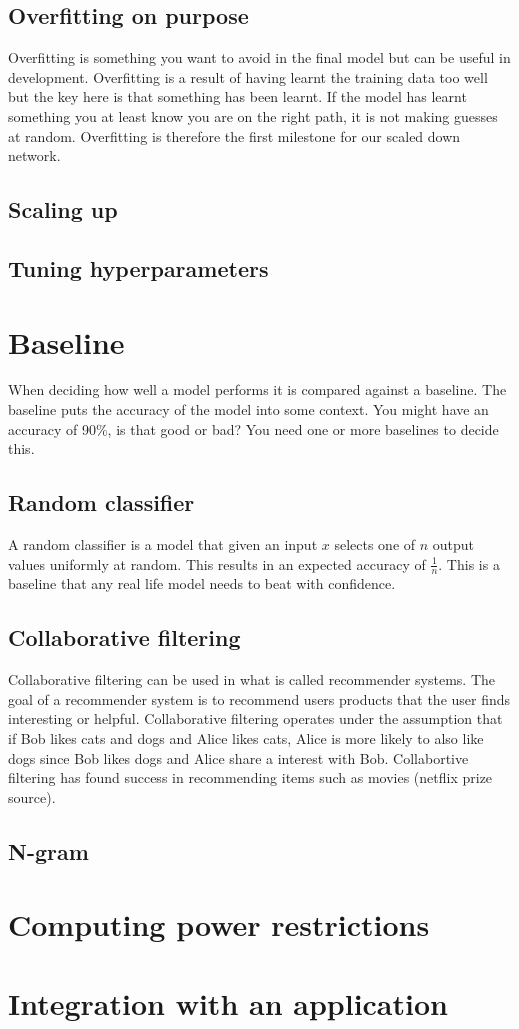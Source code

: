 \subsection{Overfitting on purpose}
Overfitting is something you want to avoid in the final model but can be useful in development. Overfitting is a result of having learnt the training data too well but the key here is that something has been learnt. If the model has learnt something you at least know you are on the right path, it is not making guesses at random. Overfitting is therefore the first milestone for our scaled down network. 
\subsection{Scaling up}
\subsection{Tuning hyperparameters}
\section{Baseline}
When deciding how well a model performs it is compared against a baseline. The baseline puts the accuracy of the model into some context. You might have an accuracy of 90\%, is that good or bad? You need one or more baselines to decide this. 
\subsection{Random classifier}
A random classifier is a model that given an input $x$ selects one of $n$ output values uniformly at random. This results in an expected accuracy of $\frac{1}{n}$. This is a baseline that any real life model needs to beat with confidence.
\subsection{Collaborative filtering}
Collaborative filtering can be used in what is called recommender systems. The goal of a recommender system is to recommend users products that the user finds interesting or helpful. Collaborative filtering operates under the assumption that if Bob likes cats and dogs and Alice likes cats, Alice is more likely to also like dogs since Bob likes dogs and Alice share a interest with Bob. Collabortive filtering has found success in recommending items such as movies (netflix prize source). %

\subsection{N-gram}
\section{Computing power restrictions} %
\section{Integration with an application}


